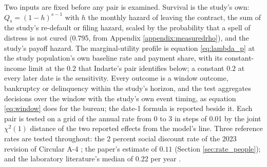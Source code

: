 Two inputs are fixed before any pair is examined. Survival is the study's own: $Q_s = (1-h)^{s-1}$ with $h$ the monthly hazard of leaving the contract, the sum of the study's re-default or filing hazard, scaled by the probability that a spell of distress is not cured (0.795, from Appendix \ref{appendix:measuredrho}), and the study's payoff hazard. The marginal-utility profile is equation \eqref{eq:lambda_p} at the study population's own baseline rate and payment share, with its constant-income limit at the $0.2$ that Indarte's pair identifies below; a constant $0.2$ at every later date is the sensitivity. Every outcome is a window outcome, bankruptcy or delinquency within the study's horizon, and the test aggregates decisions over the window with the study's own event timing, as equation \eqref{eq:window} does for the bureau; the date-1 formula is reported beside it. Each pair is tested on a grid of the annual rate from 0 to 3 in steps of 0.01 by the joint $\chi^2(1)$ distance of the two reported effects from the model's line. Three reference rates are tested throughout: the 2 percent social discount rate of the 2023 revision of Circular A-4 \citep{the_white_house_biden-harris_2023}; the paper's estimate of $0.11$ (Section \ref{sec:rate_people}); and the laboratory literature's median of 0.22 per year \citep{cohen_measuring_2020}.

